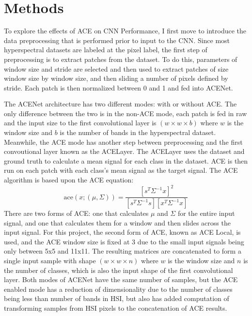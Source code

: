 \documentclass[12pt]{article}
\begin{document}
%
\section{Methods}\label{sec:methods}
To explore the effects of ACE on CNN Performance, I first move to introduce the data preprocessing that is performed prior to input to the CNN.
%
Since most hyperspectral datasets are labeled at the pixel label, the first step of preprocessing is to extract patches from the dataset.
%
To do this, parameters of window size and stride are selected and then used to extract patches of size window size by window size, and then sliding a number of pixels defined by stride.
%
Each patch is then normalized between 0 and 1 and fed into ACENet.

The ACENet architecture has two different modes: with or without ACE.
%
The only difference between the two is in the non-ACE mode, each patch is fed in raw and the input size to the first convolutional layer is $(w \times w \times b)$ where $w$ is the window size and $b$ is the number of bands in the hyperspectral dataset.
%
Meanwhile, the ACE mode has another step between preprocessing and the first convoutional layer known as the ACELayer.
%
The ACELayer uses the dataset and ground truth to calculate a mean signal for each class in the dataset.
%
ACE is then run on each patch with each class's mean signal as the target signal. 
%
The ACE algorithm is based upon the ACE equation:
$$
\text{ace}(x;(\mu,\Sigma)) = \frac{ \left[s^T \Sigma^{-1} x\right]^2 }{\left[s^T \Sigma^{-1} s\right] \left[x^T \Sigma^{-1} x\right]}
$$
%
There are two forms of ACE: one that calculates $\mu$ and $\Sigma$ for the entire input signal, and one that calculates them for a window and then slides across the input signal.
%
For this project, the second form of ACE, known as ACE Local, is used, and the ACE window size is fixed at 3 due to the small input signals being only between 5x5 and 11x11.
%
The resulting matrices are concatenated to form a single input sample with shape $(w \times w \times n)$ where $w$ is the window size and $n$ is the number of classes, which is also the input shape of the first convolutional layer.
%
Both modes of ACENet have the same number of samples, but the ACE enabled mode has a reduction of dimensionality due to the number of classes being less than number of bands in HSI, but also has added computation of transforming samples from HSI pixels to the concatenation of ACE results.
\end{document}
